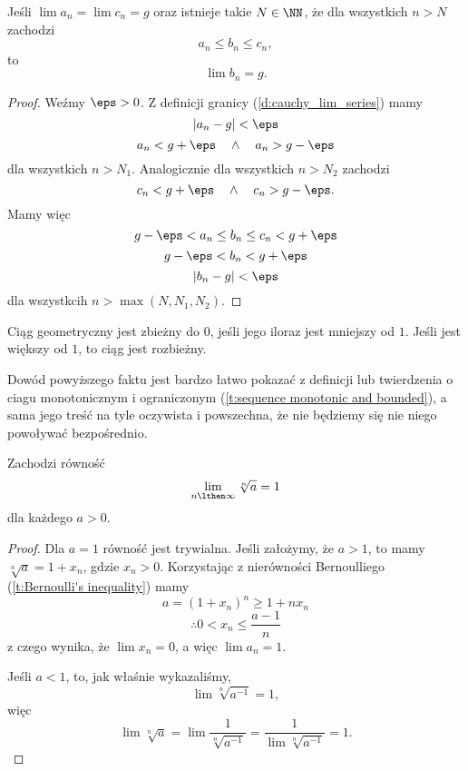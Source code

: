 \begin{theorem}
    \label{t:sequence squeeze theorem}
    Jeśli $\lim a_n = \lim c_n = g$ oraz istnieje takie $N \in \NN$, że dla wszystkich $n > N$ zachodzi
    \[ a_n \leq b_n \leq c_n, \]
    to
    \[ \lim b_n = g. \]
\end{theorem}
\begin{proof}
    Weźmy $\eps > 0$. Z definicji granicy (\ref{d:cauchy_lim_series}) mamy
    \[ |a_n - g| < \eps \]
    \[ a_n < g + \eps \quad\land\quad a_n > g - \eps \]
    dla wszystkich $n > N_1$.
    Analogicznie dla wszystkich $n > N_2$ zachodzi
    \[ c_n < g + \eps \quad\land\quad c_n > g - \eps. \]
    Mamy więc
    \[ g - \eps < a_n \leq b_n \leq c_n < g + \eps \]
    \[ g - \eps < b_n < g + \eps \]
    \[ |b_n - g| < \eps \]
    dla wszystkcih $n > \max(N, N_1, N_2)$.
\end{proof}

\begin{fact}
    Ciąg geometryczny jest zbieżny do $0$, jeśli jego iloraz jest mniejszy od $1$. Jeśli jest większy od $1$, to ciąg jest rozbieżny.
\end{fact}
Dowód powyższego faktu jest bardzo łatwo pokazać z definicji lub twierdzenia o ciagu monotonicznym i ograniczonym (\ref{t:sequence monotonic and bounded}), a sama jego treść na tyle oczywista i powszechna, że nie będziemy się nie niego powoływać bezpośrednio.

\begin{theorem}
    \label{t:(a)^(1/n)->1}
    Zachodzi równość
    \[ \lim_{n \lthen \infty}\sqrt[n]{a} = 1 \]
    dla każdego $a > 0$.
\end{theorem}
\begin{proof}
    Dla $a = 1$ równość jest trywialna. Jeśli założymy, że $a > 1$, to mamy $\sqrt[n]{a} = 1 + x_n$, gdzie $x_n > 0$. Korzystając z nierówności Bernoulliego (\ref{t:Bernoulli's inequality}) mamy
    \[ a = (1 + x_n)^n \geq 1 + nx_n \]
    \[ \therefore 0 < x_n \leq \frac{a - 1}{n} \]
    z czego wynika, że $\lim x_n = 0$, a więc $\lim a_n = 1$.

    Jeśli $a < 1$, to, jak właśnie wykazaliśmy,
    \[ \lim \sqrt[n]{a^{-1}} = 1, \]
    więc
    \[ \lim \sqrt[n]{a} = \lim \frac{1}{\sqrt[n]{a^{-1}}} = \frac{1}{\lim\sqrt[n]{a^{-1}}} = 1. \]
\end{proof}

